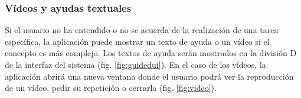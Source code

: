 \subsubsection{Vídeos y ayudas textuales}

Si el usuario no ha entendido o no se acuerda de la realización de una tarea específica, la aplicación puede mostrar un texto de ayuda o un vídeo si el concepto es más complejo. Los textos de ayuda serán mostrados en la división D de la interfaz del sistema (fig. \ref{fig:guidedui}). En el caso de los vídeos, la aplicación abrirá una nueva ventana donde el usuario podrá ver la reproducción de un vídeo, pedir su repetición o cerrarla (fig. \ref{fig:video}).



